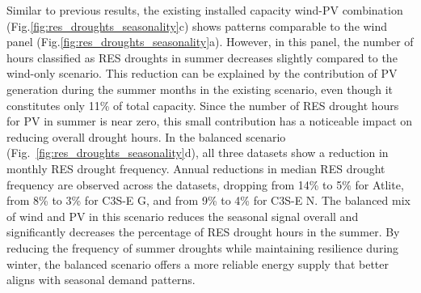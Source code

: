 \documentclass[a4paper, 11p1t]{article}
\begin{document}
Similar to previous results, the existing installed capacity wind-PV combination (Fig.\ref{fig:res_droughts_seasonality}c) shows patterns comparable to the wind panel (Fig.\ref{fig:res_droughts_seasonality}a). However, in this panel, the number of hours classified as RES droughts in summer decreases slightly compared to the wind-only scenario. This reduction can be explained by the contribution of PV generation during the summer months in the existing scenario, even though it constitutes only 11\% of total capacity. Since the number of RES drought hours for PV in summer is near zero, this small contribution has a noticeable impact on reducing overall drought hours. In the balanced scenario (Fig.~\ref{fig:res_droughts_seasonality}d), all three datasets show a reduction in monthly RES drought frequency. Annual reductions in median RES drought frequency are observed across the datasets, dropping from 14\% to 5\% for Atlite, from 8\% to 3\% for C3S-E G, and from 9\% to 4\% for C3S-E N. The balanced mix of wind and PV in this scenario reduces the seasonal signal overall and significantly decreases the percentage of RES drought hours in the summer. By reducing the frequency of summer droughts while maintaining resilience during winter, the balanced scenario offers a more reliable energy supply that better aligns with seasonal demand patterns. 
\end{document}
